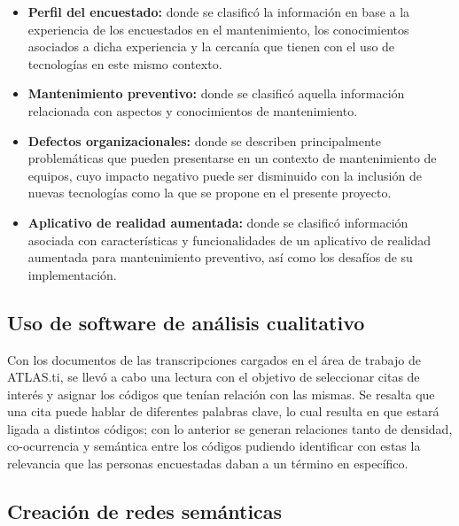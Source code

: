         \begin{itemize}

            \item \textbf{Perfil del encuestado:} donde se clasificó la información en base a la experiencia de los encuestados en el mantenimiento, los conocimientos asociados a dicha experiencia y la cercanía que tienen con el uso de tecnologías en este mismo contexto.

            \item \textbf{Mantenimiento preventivo:} donde se clasificó aquella información relacionada con aspectos y conocimientos de mantenimiento.

            \item \textbf{Defectos organizacionales:} donde se describen principalmente problemáticas que pueden presentarse en un contexto de mantenimiento de equipos, cuyo impacto negativo puede ser disminuido con la inclusión de nuevas tecnologías como la que se propone en el presente proyecto.

            \item \textbf{Aplicativo de realidad aumentada:} donde se clasificó información asociada con características y funcionalidades de un aplicativo de realidad aumentada para mantenimiento preventivo, así como los desafíos de su implementación.

        \end{itemize}

        

    \subsection{Uso de software de análisis cualitativo}

        Con los documentos de las transcripciones cargados en el área de trabajo de ATLAS.ti, se llevó a cabo una lectura con el objetivo de seleccionar citas de interés y asignar los códigos que tenían relación con las mismas. Se resalta que una cita puede hablar de diferentes palabras clave, lo cual resulta en que estará ligada a distintos códigos; con lo anterior se generan relaciones tanto de densidad, co-ocurrencia y semántica entre los códigos pudiendo identificar con estas la relevancia que las personas encuestadas daban a un término en específico.


    \subsection{Creación de redes semánticas}

